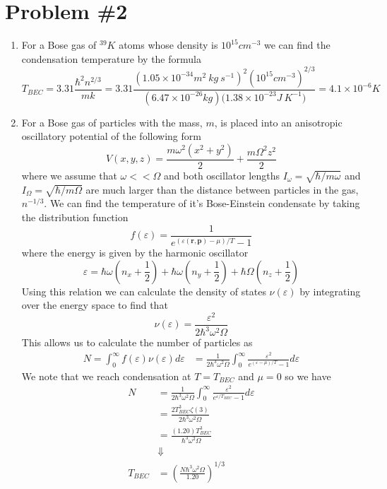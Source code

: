 \documentclass[11pt]{article}
\numberwithin{equation}{section}
\begin{document}
\section{Problem \#2}
\begin{enumerate}[(1)]
\item For a Bose gas of $^{39}K$ atoms whose density is $10^{15}\unit{cm^{-3}}$ we can find 
the condensation temperature by the formula
$$T_{BEC} = 3.31\frac{\hbar^2n^{2/3}}{mk} = 3.31\frac{(1.05\times10^{-34}\unit{m^2\ kg\ s^{-1}})^2(10^{15}\unit{cm^{-3}})^{2/3}}{(6.47\times10^{-26}\unit{kg})(1.38\times10^{-23}\unit{J\ K^{-1})}} = 4.1\times10^{-6}\unit{K}$$

\item For a Bose gas of particles with the mass, $m$, is placed into an anisotropic 
oscillatory potential of the following form
$$V(x,y,z) = \frac{m\omega^2\left(x^2+y^2\right)}{2} + \frac{m\Omega^2z^2}{2}$$
where we assume that $\omega<<\Omega$ and both oscillator lengths $I_{\omega} = \sqrt{\hbar/m\omega}$ and 
$I_{\Omega} = \sqrt{\hbar/m\Omega}$ are much larger than the distance between particles in
the gas, $n^{-1/3}$. We can find the temperature of it's Bose-Einstein condensate by taking
the distribution function
$$f(\varepsilon) = \frac{1}{e^{(\varepsilon(\mathbf{r},\mathbf{p})-\mu)/T} - 1}$$
where the energy is given by the harmonic oscillator
$$\varepsilon = \hbar\omega\left(n_x+\frac{1}{2}\right) + \hbar\omega\left(n_y+\frac{1}{2}\right) + \hbar\Omega\left(n_z+\frac{1}{2}\right)$$
Using this relation we can calculate the density of states $\nu(\varepsilon)$ by integrating 
over the energy space to find that 
$$\nu(\varepsilon) = \frac{\varepsilon^2}{2\hbar^3\omega^2\Omega}$$
This allows us to calculate the number of particles as
\begin{align*}
N = \int_{0}^{\infty}f(\varepsilon)\nu(\varepsilon)d\varepsilon &=  \frac{1}{2\hbar^3\omega^2\Omega}\int_{0}^{\infty}\frac{\varepsilon^2}{e^{(\varepsilon-\mu)/T}-1}d\varepsilon
\end{align*}
We note that we reach condensation at $T=T_{BEC}$ and $\mu=0$ so we have
\begin{align*}
N &=  \frac{1}{2\hbar^3\omega^2\Omega}\int_{0}^{\infty}\frac{\varepsilon^2}{e^{\varepsilon/T_{BEC}}-1}d\varepsilon\\
&= \frac{2T_{BEC}^3\zeta(3)}{2\hbar^3\omega^2\Omega}\\
&= \frac{(1.20)T_{BEC}^3}{\hbar^3\omega^2\Omega}\\
&\Downarrow\\
T_{BEC} &= \left(\frac{N\hbar^3\omega^2\Omega}{1.20}\right)^{1/3}
\end{align*}


\end{enumerate}
\end{document}
